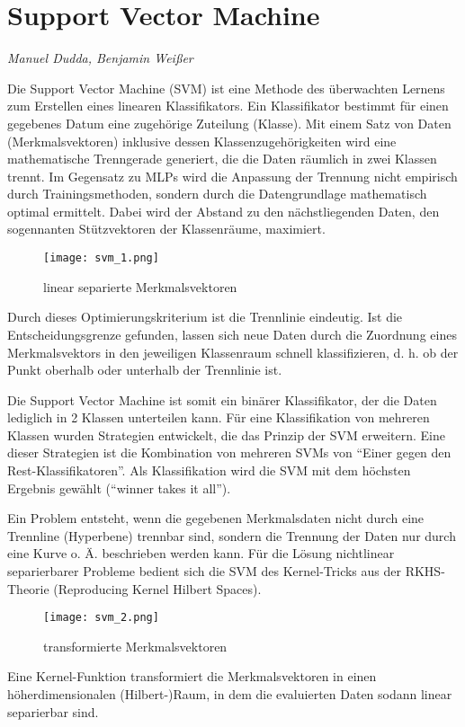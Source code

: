 \section{Support Vector Machine}
\textit{Manuel Dudda, Benjamin Weißer}

Die Support Vector Machine (SVM) ist eine Methode des überwachten Lernens zum Erstellen eines linearen Klassifikators. 
Ein Klassifikator bestimmt für einen gegebenes Datum eine zugehörige Zuteilung (Klasse). Mit einem Satz von Daten (Merkmalsvektoren) inklusive dessen Klassenzugehörigkeiten wird eine mathematische Trenngerade generiert, die die Daten räumlich in zwei Klassen trennt. 
Im Gegensatz zu MLPs wird die Anpassung der Trennung nicht empirisch durch Trainingsmethoden, sondern durch die Datengrundlage mathematisch optimal ermittelt. 
Dabei wird der Abstand zu den nächstliegenden Daten, den sogennanten Stützvektoren der Klassenräume, maximiert.


\begin{wrapfigure}{r}{0.48\textwidth}
	\vspace{-30pt}
	\begin{center}
		 \texttt{[image: svm\_1.png]}
	\end{center}
	\vspace{-15pt}
	\caption{linear separierte Merkmalsvektoren}
	\vspace{-15pt} 
\end{wrapfigure}

Durch dieses Optimierungskriterium ist die Trennlinie eindeutig. 
Ist die Entscheidungsgrenze gefunden, lassen sich neue Daten durch die Zuordnung eines Merkmalsvektors in den jeweiligen Klassenraum schnell klassifizieren, d. h. ob der Punkt oberhalb oder unterhalb der Trennlinie ist.

Die Support Vector Machine ist somit ein binärer Klassifikator, der die Daten lediglich in 2 Klassen unterteilen kann. 
Für eine Klassifikation von mehreren Klassen wurden Strategien entwickelt, die das Prinzip der SVM erweitern. 
Eine dieser Strategien ist die Kombination von mehreren SVMs von “Einer gegen den Rest-Klassifikatoren”. 
Als Klassifikation wird die SVM mit dem höchsten Ergebnis gewählt (“winner takes it all”).

Ein Problem entsteht, wenn die gegebenen Merkmalsdaten nicht durch eine Trennline (Hyperbene) trennbar sind, sondern die Trennung der Daten nur durch eine Kurve o. Ä. beschrieben werden kann. 
Für die Lösung nichtlinear separierbarer Probleme bedient sich die SVM des Kernel-Tricks aus der RKHS-Theorie (Reproducing Kernel Hilbert Spaces). 
\begin{wrapfigure}{l}{0.45\textwidth}
	\vspace{-30pt}
	\begin{center}
	    \texttt{[image: svm\_2.png]}
	\end{center}
	\vspace{-15pt}
	\caption{transformierte Merkmalsvektoren}
		\vspace{-65pt}
\end{wrapfigure}
Eine Kernel-Funktion transformiert die Merkmalsvektoren in einen höherdimensionalen (Hilbert-)Raum, in dem die evaluierten Daten sodann linear separierbar sind.



